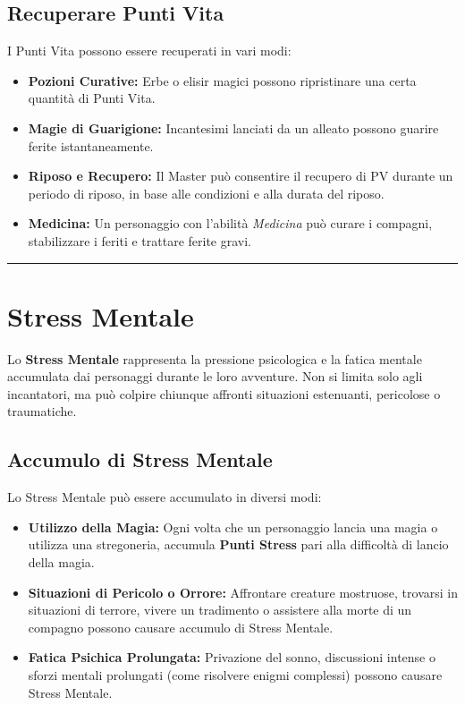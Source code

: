 \documentclass[../manuale_main.tex]{subfiles}
\begin{document}
\vspace{0.3cm}

\subsection*{Recuperare Punti Vita}
I Punti Vita possono essere recuperati in vari modi:
\begin{itemize}
    \item \textbf{Pozioni Curative:} Erbe o elisir magici possono ripristinare una certa quantità di Punti Vita.
    \item \textbf{Magie di Guarigione:} Incantesimi lanciati da un alleato possono guarire ferite istantaneamente.
    \item \textbf{Riposo e Recupero:} Il Master può consentire il recupero di PV durante un periodo di riposo, in base alle condizioni e alla durata del riposo.
    \item \textbf{Medicina:} Un personaggio con l'abilità \textit{Medicina} può curare i compagni, stabilizzare i feriti e trattare ferite gravi.
\end{itemize}

\vspace{0.5cm}
\noindent
\begin{center}
\rule{\textwidth}{0.4pt} 
\end{center}
\vspace{0.5cm}

\section{Stress Mentale}

Lo \textbf{Stress Mentale} rappresenta la pressione psicologica e la fatica mentale accumulata dai personaggi durante le loro avventure. Non si limita solo agli incantatori, ma può colpire chiunque affronti situazioni estenuanti, pericolose o traumatiche.  

\subsection*{Accumulo di Stress Mentale}
Lo Stress Mentale può essere accumulato in diversi modi:
\begin{itemize}
    \item \textbf{Utilizzo della Magia:} Ogni volta che un personaggio lancia una magia o utilizza una stregoneria, accumula \textbf{Punti Stress} pari alla difficoltà di lancio della magia. 
    
    \item \textbf{Situazioni di Pericolo o Orrore:} Affrontare creature mostruose, trovarsi in situazioni di terrore, vivere un tradimento o assistere alla morte di un compagno possono causare accumulo di Stress Mentale.
    
    \item \textbf{Fatica Psichica Prolungata:} Privazione del sonno, discussioni intense o sforzi mentali prolungati (come risolvere enigmi complessi) possono causare Stress Mentale.
\end{itemize}
\end{document}
